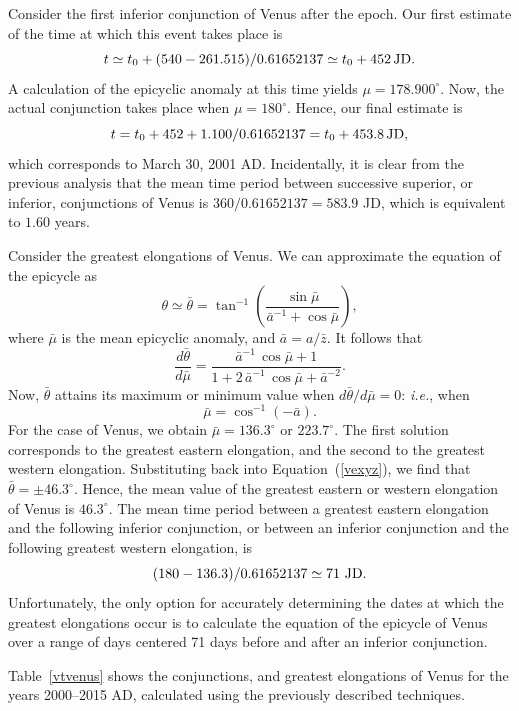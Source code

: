 Consider the first inferior conjunction of Venus after the epoch. Our first estimate of the time at which this
event takes place is 
$$
t\simeq t_0+(540-261.515)/0.61652137\simeq t_0 + 452\,{\rm JD}.
$$
A calculation of
the epicyclic anomaly at this time yields $\mu=178.900^\circ$. Now, the
actual conjunction takes place when $\mu=180^\circ$. 
 Hence, our final estimate is
$$
t = t_0 +452+1.100/0.61652137 = t_0+453.8\,{\rm JD},
$$
which corresponds to
March 30, 2001 AD. Incidentally, it is clear from the previous analysis that the
mean  time period between successive superior, or  inferior, conjunctions of Venus is $360/0.61652137= 583.9$ JD, which is
equivalent to $1.60$ years.

Consider the greatest elongations of Venus. We can approximate the
equation of the epicycle as
\begin{equation}\label{vexyz}
\theta\simeq \bar{\theta} = \tan^{-1}\left(\frac{\sin \bar{\mu}}{\bar{a}^{-1}+\cos\bar{\mu}}\right),
\end{equation}
where $\bar{\mu}$ is the mean epicyclic anomaly, and $\bar{a}=a/\bar{z}$. 
It follows that
\begin{equation}
\frac{d\bar{\theta}}{d\bar{\mu}} = \frac{\bar{a}^{-1}\,\cos\bar{\mu}+1}
{1 + 2\,\bar{a}^{-1}\,\cos\bar{\mu} + \bar{a}^{-2}}.
\end{equation}
Now, $\bar{\theta}$ attains its maximum or minimum value when
$d\bar{\theta}/d\bar{\mu}=0$: {\em i.e.}, when
\begin{equation}
\bar{\mu} = \cos^{-1}(-\bar{a}).
\end{equation}
For the case of Venus, we obtain $\bar{\mu} = 136.3^\circ$ or $223.7^\circ$. 
The first solution corresponds to the greatest eastern elongation, and the
second to the greatest western elongation. Substituting back into Equation~(\ref{vexyz}), we find that $\bar{\theta} = \pm 46.3^\circ$.
Hence, the mean value of the greatest eastern or western
elongation of Venus is $46.3^\circ$. The mean time period
between a greatest eastern elongation and the following
inferior conjunction, or between an inferior conjunction and the
following greatest western elongation, is $$(180-136.3)/0.61652137\simeq
71\,\,{\rm JD}.$$ Unfortunately, the only option for accurately determining the  dates at which the greatest elongations occur is to calculate
the equation of the epicycle of Venus over a range of days centered 71 days  before and after an inferior conjunction.

Table~\ref{vtvenus} shows the conjunctions, and greatest elongations
of Venus for the years 2000--2015 AD, calculated using the previously 
described techniques.

